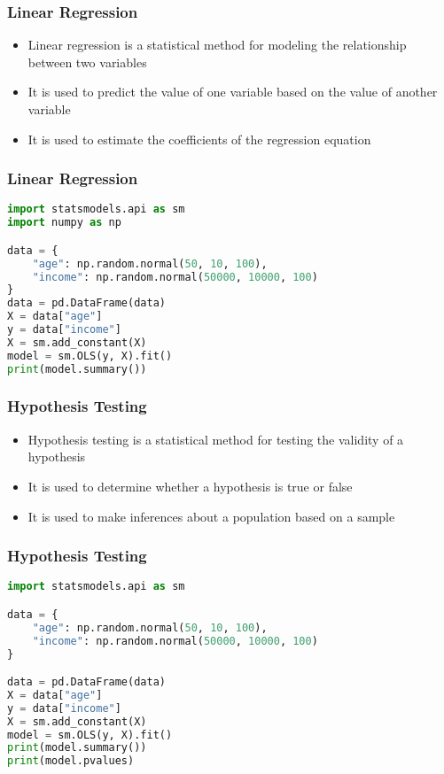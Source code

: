 \documentclass[serif, 9pt, aspectratio=32]{beamer}
\begin{document}
\begin{frame}
    \centering
    \frametitle{Linear Regression}
    \begin{itemize}
        \setlength{\itemsep}{2em}
        \item Linear regression is a statistical method for modeling the relationship between two variables
        \item It is used to predict the value of one variable based on the value of another variable
        \item It is used to estimate the coefficients of the regression equation
    \end{itemize}
\end{frame}

\begin{frame}[fragile]
    \frametitle{Linear Regression}
    \begin{lstlisting}[language=Python]
import statsmodels.api as sm
import numpy as np

data = {
    "age": np.random.normal(50, 10, 100),
    "income": np.random.normal(50000, 10000, 100)
}
data = pd.DataFrame(data)
X = data["age"]
y = data["income"]
X = sm.add_constant(X)
model = sm.OLS(y, X).fit()
print(model.summary())
    \end{lstlisting}
\end{frame}

\begin{frame}
    \centering
    \frametitle{Hypothesis Testing}
    \begin{itemize}
        \setlength{\itemsep}{2em}
        \item Hypothesis testing is a statistical method for testing the validity of a hypothesis
        \item It is used to determine whether a hypothesis is true or false
        \item It is used to make inferences about a population based on a sample
    \end{itemize}
\end{frame}

\begin{frame}[fragile]
    \frametitle{Hypothesis Testing}
    \begin{lstlisting}[language=Python]
import statsmodels.api as sm

data = {
    "age": np.random.normal(50, 10, 100),
    "income": np.random.normal(50000, 10000, 100)
}

data = pd.DataFrame(data)
X = data["age"]
y = data["income"]
X = sm.add_constant(X)
model = sm.OLS(y, X).fit()
print(model.summary())
print(model.pvalues)
    \end{lstlisting}
\end{frame}
\end{document}
